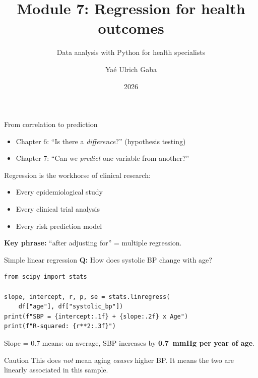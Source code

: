 \documentclass[aspectratio=169,11pt]{beamer}
\title{Module 7: Regression for health outcomes}
\subtitle{Data analysis with Python for health specialists}
\author{Yaé Ulrich Gaba}
\institute{AIRINA Labs}
\date{2026}
\begin{document}
\maketitle

\begin{frame}{From correlation to prediction}
\begin{itemize}
  \item Chapter 6: ``Is there a \emph{difference}?'' (hypothesis testing)
  \item Chapter 7: ``Can we \emph{predict} one variable from another?''
\end{itemize}

\vspace{6pt}
Regression is the \alert{workhorse of clinical research}:
\begin{itemize}
  \item Every epidemiological study
  \item Every clinical trial analysis
  \item Every risk prediction model
\end{itemize}

\vspace{6pt}
\textbf{Key phrase:} ``after adjusting for'' = multiple regression.
\end{frame}

\begin{frame}[fragile]{Simple linear regression}
\textbf{Q:} How does systolic BP change with age?

\begin{verbatim}
from scipy import stats

slope, intercept, r, p, se = stats.linregress(
    df["age"], df["systolic_bp"])
print(f"SBP = {intercept:.1f} + {slope:.2f} x Age")
print(f"R-squared: {r**2:.3f}")
\end{verbatim}

\vspace{4pt}
Slope = 0.7 means: on average, SBP increases by \textbf{0.7~mmHg per year of age}.

\begin{exampleblock}{Caution}
This does \emph{not} mean aging \emph{causes} higher BP. It means the two are linearly associated in this sample.
\end{exampleblock}
\end{frame}
\end{document}
